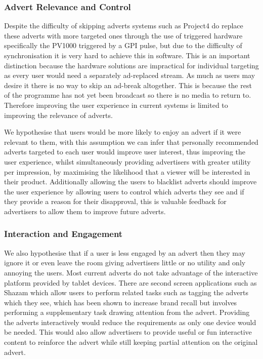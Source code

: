 \subsubsection{Advert Relevance and Control}
Despite the difficulty of skipping adverts systems such as Project4 do replace these adverts with more targeted ones through the use of triggered hardware specifically the PV1000 triggered by a GPI pulse, but due to the difficulty of synchronisation\cite{softwareTimeSync} it is very hard to achieve this in software. This is an important distinction because the hardware solutions are impractical for individual targeting as every user would need a separately ad-replaced stream. As much as users may desire it there is no way to skip an ad-break altogether. This is because the rest of the programme has not yet been broadcast so there is no media to return to. Therefore improving the user experience in current systems is limited to improving the relevance of adverts.

We hypothesise that users would be more likely to enjoy an advert if it were relevant to them, with this assumption we can infer that personally recommended adverts targeted to each user would improve user interest, thus improving the user experience, whilst simultaneously providing advertisers with greater utility per impression, by maximising the likelihood that a viewer will be interested in their product. Additionally allowing the users to blacklist adverts should improve the user experience by allowing users to control which adverts they see and if they provide a reason for their disapproval, this is valuable feedback for advertisers to allow them to improve future adverts.

\subsubsection{Interaction and Engagement}
We also hypothesise that if a user is less engaged by an advert then they may ignore it or even leave the room giving advertisers little or no utility and only annoying the users. Most current adverts do not take advantage of the interactive platform provided by tablet devices. There are second screen applications such as Shazam\cite{shazam} which allow users to perform related tasks such as tagging the adverts which they see, which has been shown to increase brand recall but involves performing a supplementary task drawing attention from the advert. Providing the adverts interactively would reduce the requirements as only one device would be needed. This would also allow advertisers to provide useful or fun interactive content to reinforce the advert while still keeping partial attention on the original advert.


